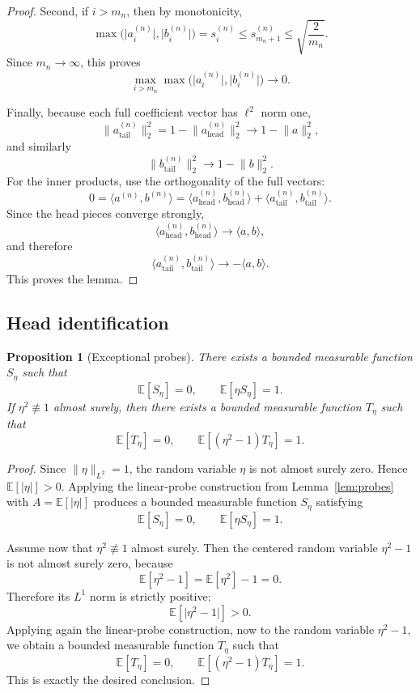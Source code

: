 \documentclass[11pt]{amsart}
\numberwithin{equation}{section}
\newtheorem{proposition}[theorem]{Proposition}
\theoremstyle{definition}
\theoremstyle{remark}
\newcommand{\E}{\mathbb E}
\newcommand{\abs}[1]{\lvert #1 \rvert}
\newcommand{\norm}[1]{\lVert #1 \rVert}
\newcommand{\ip}[2]{\langle #1,#2\rangle}
\begin{document}
\begin{proof}
Second, if $i>m_n$, then by monotonicity,
\[
\max\bigl(\abs{a_i^{(n)}},\abs{b_i^{(n)}}\bigr)
=s_i^{(n)}
\le s_{m_n+1}^{(n)}
\le \sqrt{\frac{2}{m_n}}.
\]
Since $m_n\to\infty$, this proves
\[
\max_{i>m_n}\max\bigl(\abs{a_i^{(n)}},\abs{b_i^{(n)}}\bigr)\to0.
\]

Finally, because each full coefficient vector has $\ell^2$ norm one,
\[
\norm{a_{\mathrm{tail}}^{(n)}}_2^2
=1-\norm{a_{\mathrm{head}}^{(n)}}_2^2
\longrightarrow 1-\norm{a}_2^2,
\]
and similarly
\[
\norm{b_{\mathrm{tail}}^{(n)}}_2^2
\longrightarrow 1-\norm{b}_2^2.
\]
For the inner products, use the orthogonality of the full vectors:
\[
0
=\ip{a^{(n)}}{b^{(n)}}
=\ip{a_{\mathrm{head}}^{(n)}}{b_{\mathrm{head}}^{(n)}}
+\ip{a_{\mathrm{tail}}^{(n)}}{b_{\mathrm{tail}}^{(n)}}.
\]
Since the head pieces converge strongly,
\[
\ip{a_{\mathrm{head}}^{(n)}}{b_{\mathrm{head}}^{(n)}}
\to \ip{a}{b},
\]
and therefore
\[
\ip{a_{\mathrm{tail}}^{(n)}}{b_{\mathrm{tail}}^{(n)}}
\to -\ip{a}{b}.
\]
This proves the lemma.
\end{proof}

\subsection{Head identification}

\begin{proposition}[Exceptional probes]\label{prop:exceptional-probes}
There exists a bounded measurable function $S_\eta$ such that
\[
\E[S_\eta]=0,
\qquad
\E[\eta S_\eta]=1.
\]
If $\eta^2\not\equiv1$ almost surely, then there exists a bounded measurable
function $T_\eta$ such that
\[
\E[T_\eta]=0,
\qquad
\E[(\eta^2-1)T_\eta]=1.
\]
\end{proposition}

\begin{proof}
Since $\norm{\eta}_{L^2}=1$, the random variable $\eta$ is not almost surely
zero.  Hence $\E[\abs{\eta}]>0$.  Applying the linear-probe construction from
Lemma~\ref{lem:probes} with $A=\E[\abs{\eta}]$ produces a bounded measurable
function $S_\eta$ satisfying
\[
\E[S_\eta]=0,
\qquad
\E[\eta S_\eta]=1.
\]

Assume now that $\eta^2\not\equiv1$ almost surely.  Then the centered random
variable $\eta^2-1$ is not almost surely zero, because
\[
\E[\eta^2-1]=\E[\eta^2]-1=0.
\]
Therefore its $L^1$ norm is strictly positive:
\[
\E[\abs{\eta^2-1}]>0.
\]
Applying again the linear-probe construction, now to the random variable
$\eta^2-1$, we obtain a bounded measurable function $T_\eta$ such that
\[
\E[T_\eta]=0,
\qquad
\E[(\eta^2-1)T_\eta]=1.
\]
This is exactly the desired conclusion.
\end{proof}
\end{document}
